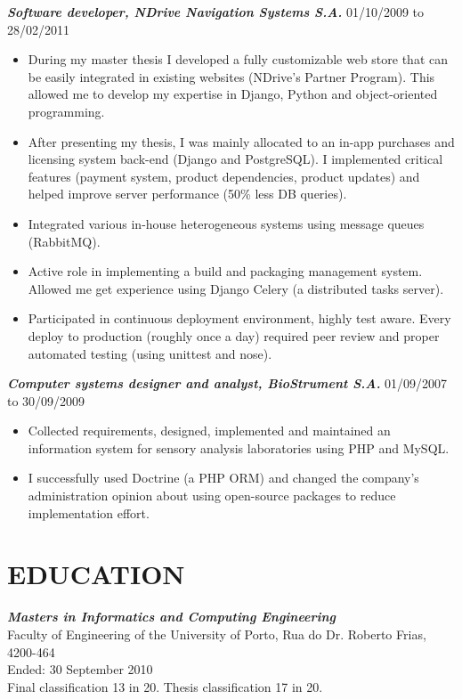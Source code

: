 \documentclass[line,margin]{resume}
\begin{document}
\begin{resume}
    {\sl\bf Software developer, NDrive Navigation Systems S.A.} \hfill 01/10/2009 to 28/02/2011
    \begin{itemize}
        \item During my master thesis I developed a fully customizable web store that can be easily integrated in existing websites (NDrive's Partner Program). This allowed me to develop my expertise in Django, Python and object-oriented programming.
        \item After presenting my thesis, I was mainly allocated to an in-app purchases and licensing system back-end (Django and PostgreSQL). I implemented critical features (payment system, product dependencies, product updates) and helped improve server performance (50\% less DB queries).
        \item Integrated various in-house heterogeneous systems using message queues (RabbitMQ).
        \item Active role in implementing a build and packaging management system. Allowed me get experience using Django Celery (a distributed tasks server).
        \item Participated in continuous deployment  environment, highly test aware. Every deploy to production (roughly once a day) required peer review and proper automated testing (using unittest and nose).
     \end{itemize}
    {\sl\bf Computer systems designer and analyst, BioStrument S.A.} \hfill 01/09/2007 to 30/09/2009
     \begin{itemize}
         \item Collected requirements, designed, implemented and maintained an information system for sensory analysis laboratories using PHP and MySQL.
         \item I successfully used Doctrine (a PHP ORM) and changed the company's administration opinion about using open-source packages to reduce implementation effort.
     \end{itemize}

\section{EDUCATION}
    {\sl\bf Masters in Informatics and Computing Engineering}\\
    Faculty of Engineering of the University of Porto, Rua do Dr. Roberto Frias, 4200-464\\
    Ended: 30 September 2010\\
    Final classification 13 in 20. Thesis classification 17 in 20.

\end{resume}
\end{document}
